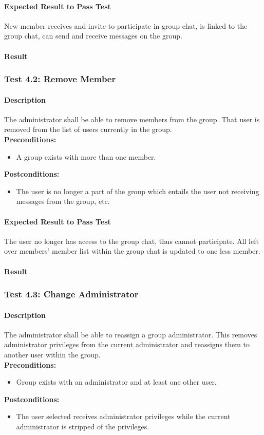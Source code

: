 \documentclass[11pt]{article}
\begin{document}
\paragraph{Expected Result to Pass Test}
New member receives and invite to participate in group chat, is linked to the group chat, can send and receive messages on the group.
\paragraph{Result}
\subsubsection{Test 4.2: Remove Member}
\paragraph{Description}
The administrator shall be able to remove members from the group. That user is removed from the list of users currently in the group.\\
\textbf{Preconditions:} 
\begin{itemize}
\item A group exists with more than one member.
\end{itemize}
\textbf{Postconditions:}
\begin{itemize}
\item The user is no longer a part of the group which entails the user not receiving messages from the group, etc.
\end{itemize}
\paragraph{Expected Result to Pass Test}
The user no longer has access to the group chat, thus cannot participate. All left over members' member list within the group chat is updated to one less member.
\paragraph{Result}

\subsubsection{Test 4.3: Change Administrator}
\paragraph{Description}
The administrator shall be able to reassign a group
administrator. This removes administrator privileges from the current administrator and reassigns them to another user within the group.\\
\textbf{Preconditions:} 
\begin{itemize}
\item Group exists with an administrator and at least
one other user.
\end{itemize}
\textbf{Postconditions:}
\begin{itemize}
\item The user selected receives administrator privileges while the current administrator is stripped of the privileges.
\end{itemize}
\end{document}
